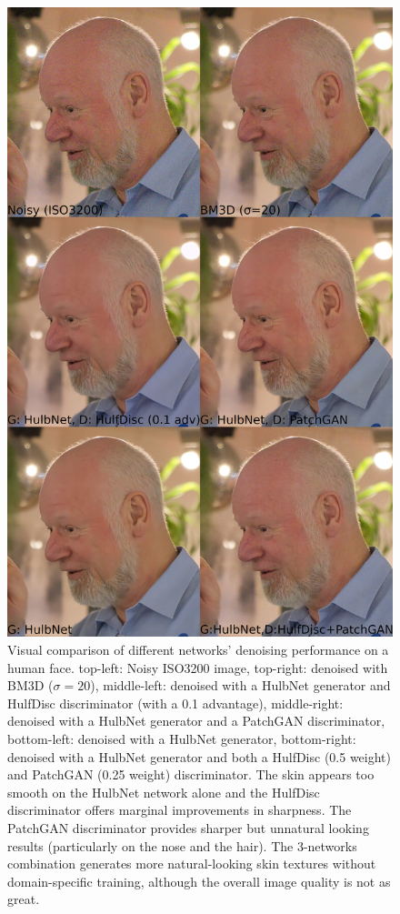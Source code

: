 \begin{figure}[!htbp]
\centering
\includegraphics[width=1\linewidth,height=0.70\textheight,keepaspectratio]{gfx/comp/face.jpg}
\caption[Denoising a face with cGANs (visual comparison)]{Visual comparison of different networks' denoising performance on a human face. top-left: Noisy ISO3200 image, top-right: denoised with \ac{BM3D} ($\sigma = 20$), middle-left: denoised with a HulbNet generator and HulfDisc discriminator (with a 0.1 advantage), middle-right: denoised with a HulbNet generator and a PatchGAN discriminator, bottom-left: denoised with a HulbNet generator, bottom-right: denoised with a HulbNet generator and both a HulfDisc (0.5 weight) and PatchGAN (0.25 weight) discriminator. The skin appears too smooth on the HulbNet network alone and the HulfDisc discriminator offers marginal improvements in sharpness. The PatchGAN discriminator provides sharper but unnatural looking results (particularly on the nose and the hair). The 3-networks combination generates more natural-looking skin textures without domain-specific training, although the overall image quality is not as great.}
\label{fig:skin}
\end{figure}

